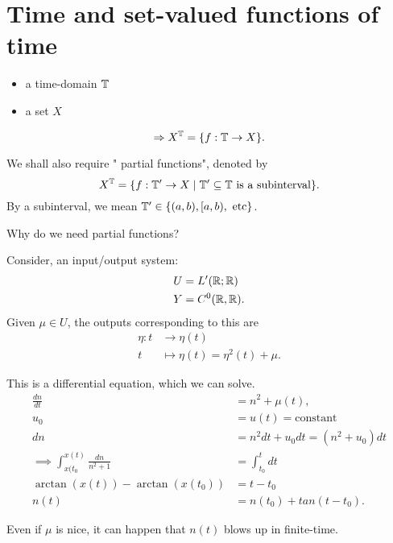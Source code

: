 
\section{Time and set-valued functions of time}

\begin{itemize}
	\item a time-domain $\mathbb{T}$ 
	\item a set $X$		
\end{itemize}
\[
\Rightarrow	X^{\mathbb{T}} = \{f : \mathbb{T} \to X\}
.\] 

We shall also require " partial functions", denoted by 
\[
	X^{\mathbb{T}} = \{f : \mathbb{T}' \to X  \mid \mathbb{T}' \subseteq \mathbb{T} \text{ is a  subinterval} \}
.\] 
By a subinterval, we mean $\mathbb{T}' \in  \{(a,b), [a,b), \text{ etc}\}$. 

Why do we need partial functions? 

\begin{example}
	Consider, an input/output system:
	\begin{align*}
		U &= L'(\mathbb{R}; \mathbb{R}) \\
		Y &= C ^{0}(\mathbb{R}, \mathbb{R})
	.\end{align*}
	Given $\mu \in  U$, the outputs corresponding to this are 
	\begin{align*}
		\eta: t &\longrightarrow \eta(t) \\
		t &\longmapsto \eta(t) = \eta^{2}(t) + \mu	
	.\end{align*}

	This is a differential equation, which we can solve. 
\begin{align*}
	\frac{dn}{dt}    &=  n^2 + \mu (t) ,  \\
	u_{0} &= u(t) = \text{constant} \\
	dn &= n^2 dt + u_{0} dt = (n^2 + u_{0}  ) dt \\
	\implies \int_{x(t_{0}}^{x(t)} \frac{dn}{n ^2 + 1} &= \int_{t_{0}}^{t}  dt\\
	\arctan (x(t)) - \arctan (x(t_{0})) &= t - t_{0} \\
	n(t) &= n(t_{0}) + tan(t - t_{0})
.\end{align*}
	
	\begin{conclusion}
		Even if $\mu$ is nice, it can happen that $n(t)$ blows up in finite-time. 
	\end{conclusion}
\end{example}

